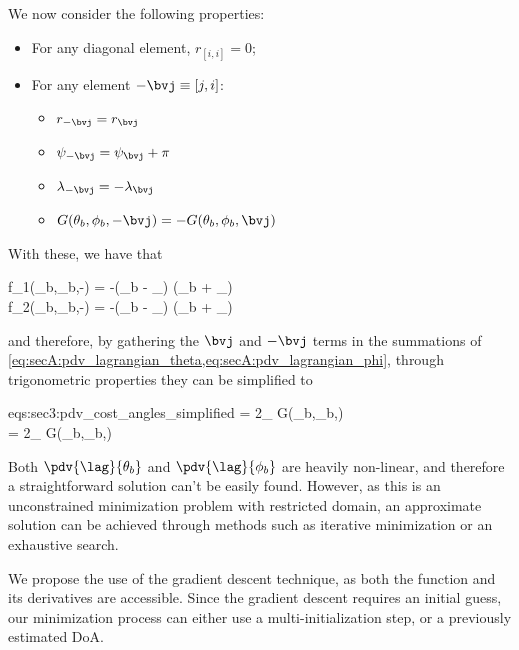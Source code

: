 We now consider the following properties:
\begin{itemize}
	\item For any diagonal element, $r_{[i,i]} = 0$;
	\item For any element $-\bvj \equiv [j,i]$:
	\begin{itemize}
		\item $r_{-\bvj} = r_{\bvj}$
		\item $\psi_{-\bvj} = \psi_{\bvj} + \pi$
		\item $\lambda_{-\bvj} = -\lambda_{\bvj}$
		\item $G(\theta_b,\phi_b,-\bvj) = -G(\theta_b,\phi_b,\bvj)$
	\end{itemize}
\end{itemize}
With these, we have that
\begin{subgather}
	f_1(\theta_b,\phi_b,-\bvj) = -\sin(\theta_b - \psi_{\bvj}) \cos(\phi_b + \lambda_{\bvj}) \\
	f_2(\theta_b,\phi_b,-\bvj) = -\cos(\theta_b - \psi_{\bvj}) \sin(\phi_b + \lambda_{\bvj})
\end{subgather}
and therefore, by gathering the $\bvj$ and $-\bvj$ terms in the summations of \cref{eq:secA:pdv_lagrangian_theta,eq:secA:pdv_lagrangian_phi}, through trigonometric properties they can be simplified to
\begin{subgather}{eqs:sec3:pdv_cost_angles_simplified}
	 = 2\cos{}\sum_{} \sin{} \cos\pts{\lambda_{\bvj}} G(\theta_b,\phi_b,\bvj) \label{eqs:sec3:pdv_cost_angles_simplified:subeq1}\\
	 = 2\sin{}\sum_{} \cos{} \cos\pts{\lambda_{\bvj}} G(\theta_b,\phi_b,\bvj) \label{eqs:sec3:pdv_cost_angles_simplified:subeq2}
\end{subgather}

Both $\pdv{\lag}{\theta_b}$ and $\pdv{\lag}{\phi_b}$ are heavily non-linear, and therefore a straightforward solution can't be easily found. However, as this is an unconstrained minimization problem with restricted domain, an approximate solution can be achieved through methods such as iterative minimization or an exhaustive search.

We propose the use of the gradient descent technique, as both the function and its derivatives are accessible. Since the gradient descent requires an initial guess, our minimization process can either use a multi-initialization step, or a previously estimated DoA.


